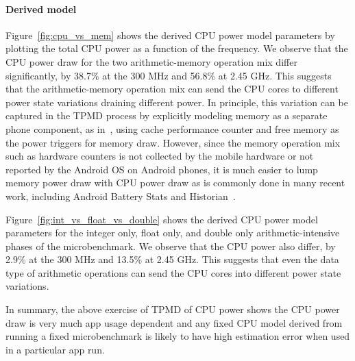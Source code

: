 \paragraph{Derived model}
Figure~\ref{fig:cpu_vs_mem} shows the derived CPU power model parameters
by plotting the total CPU power
as a function of the frequency.
We observe that the CPU power draw for the two arithmetic-memory operation mix differ significantly,
by 38.7\% at the 300 MHz and 56.8\% at 2.45 GHz.
This suggests that the arithmetic-memory operation mix can send the CPU cores
to different power state variations draining different power.
In principle, this variation can be captured in the TPMD process by  
explicitly modeling memory as a separate phone component,
as in~\cite{carroll:2010,sesame:2011}, 
using cache performance counter and free memory as the power triggers for memory draw. 
{
However, since the memory operation mix such as hardware counters is not collected by the mobile hardware 
or not reported by the Android OS on Android phones, it is much easier to lump memory power draw with CPU power draw as is commonly done in many recent work, including Android Battery Stats and Historian~\cite{androidbatterystats}. 
}

Figure~\ref{fig:int_vs_float_vs_double} shows the derived CPU power model parameters for the integer only, 
float only, and double only arithmetic-intensive phases of the microbenchmark. 
We observe that the {CPU power} also differ, 
by 2.9\% at the 300 MHz and 13.5\% at 2.45 GHz.
This suggests that even the data type of arithmetic operations
can send the CPU cores into different power state variations.

In summary, the above exercise of TPMD of CPU power shows the CPU power 
draw is very much app usage dependent and any fixed CPU model derived from
running a fixed microbenchmark is likely to have high estimation error when 
used in a particular app run. 
\fi


\fi